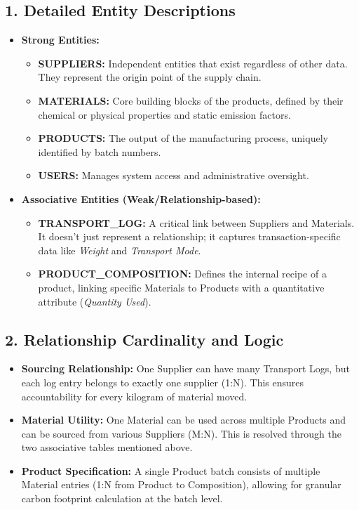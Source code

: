 \documentclass[12pt,a4paper]{article}
\begin{document}
\subsection*{1. Detailed Entity Descriptions}
\begin{itemize}
    \item \textbf{Strong Entities:} 
    \begin{itemize}
        \item \textbf{SUPPLIERS:} Independent entities that exist regardless of other data. They represent the origin point of the supply chain.
        \item \textbf{MATERIALS:} Core building blocks of the products, defined by their chemical or physical properties and static emission factors.
        \item \textbf{PRODUCTS:} The output of the manufacturing process, uniquely identified by batch numbers.
        \item \textbf{USERS:} Manages system access and administrative oversight.
    \end{itemize}
    \item \textbf{Associative Entities (Weak/Relationship-based):}
    \begin{itemize}
        \item \textbf{TRANSPORT\_LOG:} A critical link between Suppliers and Materials. It doesn't just represent a relationship; it captures transaction-specific data like \textit{Weight} and \textit{Transport Mode}.
        \item \textbf{PRODUCT\_COMPOSITION:} Defines the internal recipe of a product, linking specific Materials to Products with a quantitative attribute (\textit{Quantity Used}).
    \end{itemize}
\end{itemize}

\subsection*{2. Relationship Cardinality and Logic}
\begin{itemize}
    \item \textbf{Sourcing Relationship:} One Supplier can have many Transport Logs, but each log entry belongs to exactly one supplier (1:N). This ensures accountability for every kilogram of material moved.
    \item \textbf{Material Utility:} One Material can be used across multiple Products and can be sourced from various Suppliers (M:N). This is resolved through the two associative tables mentioned above.
    \item \textbf{Product Specification:} A single Product batch consists of multiple Material entries (1:N from Product to Composition), allowing for granular carbon footprint calculation at the batch level.
\end{itemize}
\end{document}
